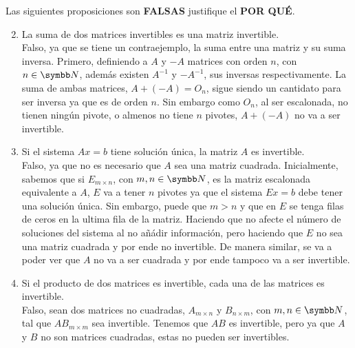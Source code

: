 \item Las siguientes proposiciones son \textbf{FALSAS} justifique el \textbf{POR QUÉ}.
    \begin{enumerate}[label=\listAlph]
        \setcounter{enumii}{1}
        \item La suma de dos matrices invertibles es una matriz invertible. \\
            Falso, ya que se tiene un contraejemplo, la suma entre una matriz y su suma inversa.
            Primero, definiendo a \(A\) y \(-A\) matrices con orden \(n\), con \(n \in \realN\), además existen \(A^{-1}\) y \(-A^{-1}\), sus inversas respectivamente.
            La suma de ambas matrices, \(A + (-A) = O_n\), sigue siendo un cantidato para ser inversa ya que es de orden \(n\). 
            Sin embargo como \(O_n\), al ser escalonada, no tienen ningún pivote, o almenos no tiene \(n\) pivotes, \(A + (-A)\) no va a ser invertible.
        \setcounter{enumii}{5}
        \item Si el sistema \(Ax = b\) tiene solución única, la matriz \(A\) es invertible. \\
            Falso, ya que no es necesario que \(A\) sea una matriz cuadrada.
            Inicialmente, sabemos que si \(E_{m \times n}\), con \(m,n \in \realN\), es la matriz escalonada equivalente a \(A\), 
            \(E\) va a tener \(n\) pivotes ya que el sistema \(Ex = b\) debe tener una solución única. 
            Sin embargo, puede que \(m > n\) y que en \(E\) se tenga filas de ceros en la ultima fila de la matriz.
            Haciendo que no afecte el número de soluciones del sistema al no añádir información, pero haciendo que \(E\) no 
            sea una matriz cuadrada y por ende no invertible. De manera similar, se va a poder ver que \(A\) no va a ser 
            cuadrada y por ende tampoco va a ser invertible.
        \setcounter{enumii}{8}
        \item Si el producto de dos matrices es invertible, cada una de las matrices es invertible. \\
            Falso, sean dos matrices no cuadradas, \(A_{m \times n}\) y \(B_{n \times m}\), con \(m,n \in \realN\), tal que \(AB_{m \times m}\)
            sea invertible. Tenemos que \(AB\) es invertible, pero ya que \(A\) y \(B\) no son matrices cuadradas, estas no pueden ser invertibles.
    \end{enumerate}
